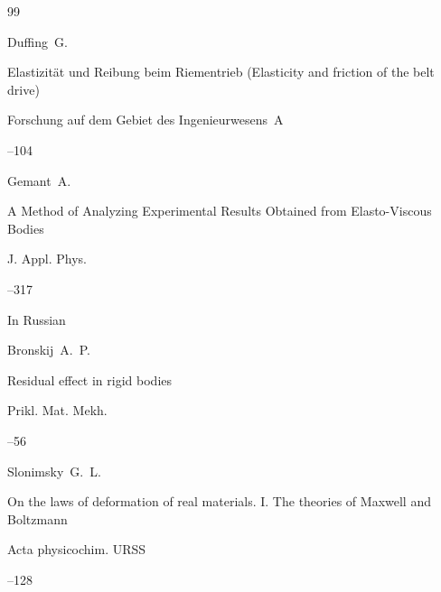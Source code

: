 \begin{thebibliography}{99}

\by Duffing~G.

\paper Elastizit\"at und Reibung beim Riementrieb (Elasticity and friction of the belt drive)

\jour Forschung auf dem Gebiet des Ingenieurwesens~A



--104








\by Gemant~A.

\paper A Method of Analyzing Experimental Results Obtained from Elasto-Viscous Bodies 

\jour J. Appl. Phys.



--317





\lang In Russian

\by Bronskij~A.~P.

\paper Residual effect in rigid bodies

\jour Prikl. Mat. Mekh. 




--56






\by Slonimsky~G.~L.

\paper On the laws of deformation of real materials. I. The theories of Maxwell and Boltzmann

\jour Acta physicochim. URSS 


--128 










\end{thebibliography}
